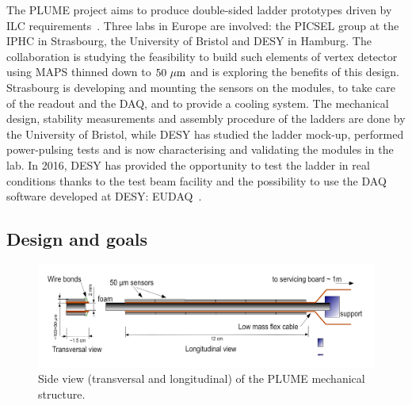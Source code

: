   The \acrfull{PLUME} project aims to produce double-sided ladder prototypes driven by \gls{ILC} requirements~\cite{PLUME}.
  Three labs in Europe are involved: the \gls{PICSEL} group at the \gls{IPHC} in Strasbourg, the University of Bristol and \gls{DESY} in Hamburg.
  The collaboration is studying the feasibility to build such elements of vertex detector using \gls{MAPS} thinned down to $50~\rm{\mu m}$ and is exploring the benefits of this design.
  Strasbourg is developing and mounting the sensors on the modules, to take care of the readout and the \gls{DAQ}, and to provide a cooling system.
  The mechanical design, stability measurements and assembly procedure of the ladders are done by the University of Bristol, while \gls{DESY} has studied the ladder mock-up, performed power-pulsing tests and is now characterising and validating the modules in the lab.
  In 2016, DESY has provided the opportunity to test the ladder in real conditions thanks to the test beam facility and the possibility to use the \gls{DAQ} software developed at DESY: EUDAQ~\cite{EUDAQ}.

    \subsection{Design and goals}

    \begin{figure}[!tbh]
      \centering
      \includegraphics[width = 15 cm]{Pictures/vxd/plume_finalGoal.png}
      \caption{Side view (transversal and longitudinal) of the PLUME mechanical structure.}
      \label{fig:PLUME}
    \end{figure}


